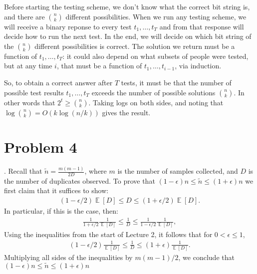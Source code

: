\documentclass[11pt]{article}
\DeclareMathOperator*{\E}{\mathbb{E}}
\begin{document}
Before starting the testing scheme, we don't know what the correct bit string is, and there are ${n \choose k}$ different possibilities. When we run any testing scheme, we will receive a binary reponse to every test $t_1, \ldots, t_T$ and from that response will decide how to run the next test. In the end, we will decide on which bit string of the ${n \choose k}$ different possibilities is correct. The solution we return must be a function of $t_1, \ldots, t_T$: it could also depend on what subsets of people were tested, but at any time $i$, that must be a function of $t_1, \ldots, t_{i-1}$, via induction. 

So, to obtain a correct answer after $T$ tests, it must be that the number of possible test results $t_1, \ldots, t_T$ exceeds the number of possible solutions ${n \choose k}$. In other words that $2^t \geq {n \choose k}$. Taking logs on both sides, and noting that $\log{n \choose k}  = O(k\log(n/k))$ gives the result.


\section*{Problem 4}
\smallskip{}.\hspace{1em} Recall that $\tilde{n} = \frac{m(m-1)}{2D}$, where $m$ is the number of samples collected, and $D$ is the number of duplicates observed. To prove that $(1-\epsilon) n \leq \tilde{n} \leq (1+\epsilon) n$ we first claim that it suffices to show:
\begin{align}
	\label{to:prove}
	(1-\epsilon/2)\E[D] \leq D \leq (1+\epsilon/2)\E[D].
\end{align}
In particular, if this is the case, then:
\begin{align*}
	\frac{1}{1+\epsilon/2}\frac{1}{\E[D]} \leq \frac{1}{D} \leq \frac{1}{1-\epsilon/2}\frac{1}{\E[D]}, 
\end{align*}
Using the inequalities from the start of Lecture 2, it follows that for $0 < \epsilon \leq 1$,
\begin{align*}
	(1-\epsilon/2)\frac{1}{\E[D]} \leq \frac{1}{D} \leq (1+\epsilon)\frac{1}{\E[D]}.
\end{align*}
Multiplying all sides of the inequalities by $m(m-1)/2$, we conclude that $(1-\epsilon) n \leq \tilde{n} \leq (1+\epsilon) n$
\end{document}
